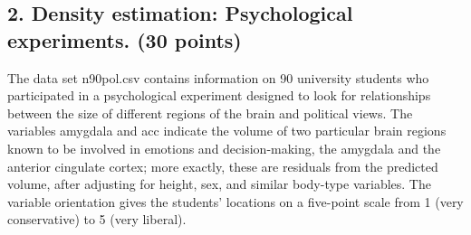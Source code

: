 \documentclass[twoside,10pt]{article}
\begin{document}
\clearpage



\subsection*{2. Density estimation: Psychological experiments. (30 points)}

 The data set \textsf{n90pol.csv} contains information on 90 university students who participated in a psychological experiment designed to look for relationships between the size of different regions of the brain and political views. The variables \textsf{amygdala} and \textsf{acc} indicate the volume of two particular brain regions known to be involved in emotions and decision-making, the amygdala and the anterior cingulate cortex; more exactly, these are residuals from the predicted volume, after adjusting for height, sex, and similar body-type variables. The variable \textsf{orientation} gives the students' locations on a five-point scale from 1 (very conservative) to 5 (very liberal).
 
\end{document}
